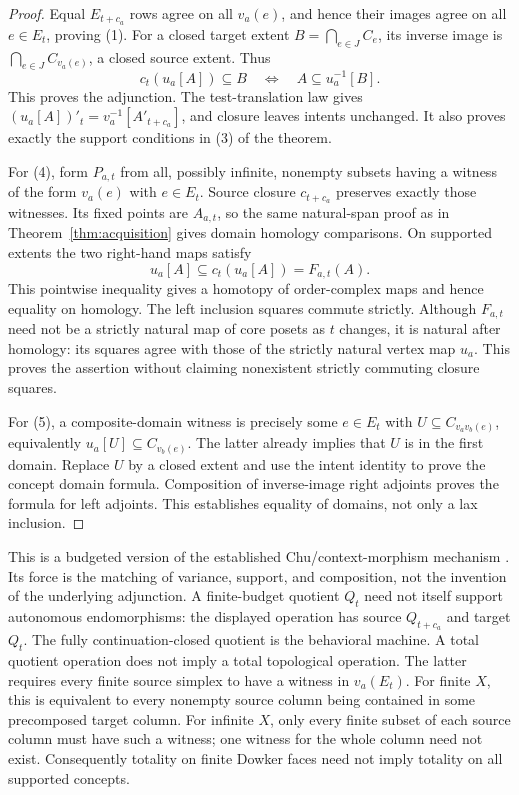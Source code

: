 \documentclass[11pt]{article}
\theoremstyle{definition}\newtheorem{definition}[theorem]{Definition}
\theoremstyle{remark}\newtheorem{remark}[theorem]{Remark}
\begin{document}
\begin{proof}
Equal $E_{t+c_a}$ rows agree on all $v_a(e)$, and hence their images agree
on all $e\in E_t$, proving (1). For a closed target extent
$B=\bigcap_{e\in J}C_e$, its inverse image is
$\bigcap_{e\in J}C_{v_a(e)}$, a closed source extent. Thus
\[
 c_t(u_a[A])\subseteq B\quad\Longleftrightarrow\quad
 A\subseteq u_a^{-1}[B].
\]
This proves the adjunction. The test-translation law gives
$(u_a[A])'_t=v_a^{-1}[A'_{t+c_a}]$, and closure leaves intents unchanged.
It also proves exactly the support conditions in (3) of the theorem.

For (4), form $P_{a,t}$ from all, possibly infinite, nonempty subsets
having a witness of the form $v_a(e)$ with $e\in E_t$.
Source closure $c_{t+c_a}$ preserves exactly those witnesses. Its fixed
points are $A_{a,t}$, so the same natural-span proof as in
Theorem~\ref{thm:acquisition} gives domain homology comparisons.
On supported extents the two right-hand maps satisfy
\[
 u_a[A]\subseteq c_t(u_a[A])=F_{a,t}(A).
\]
This pointwise inequality gives a homotopy of order-complex maps and hence
equality on homology. The left inclusion squares commute strictly.
Although $F_{a,t}$ need not be a strictly natural map of core posets as
$t$ changes, it is natural after homology: its squares agree with those
of the strictly natural vertex map $u_a$. This proves the assertion
without claiming nonexistent strictly commuting closure squares.

For (5), a composite-domain witness is precisely some $e\in E_t$ with
$U\subseteq C_{v_av_b(e)}$, equivalently $u_a[U]\subseteq C_{v_b(e)}$.
The latter already implies that $U$ is in the first domain. Replace $U$
by a closed extent and use the intent identity to prove the concept
domain formula. Composition of inverse-image right adjoints proves the
formula for left adjoints. This establishes equality of domains, not only
a lax inclusion.
\end{proof}
This is a budgeted version of the established Chu/context-morphism
mechanism \cite{shen,gratus}. Its force is the matching of variance,
support, and composition, not the invention of the underlying adjunction.
A finite-budget quotient $Q_t$ need not itself support autonomous
endomorphisms: the displayed operation has source $Q_{t+c_a}$ and target
$Q_t$. The fully continuation-closed quotient is the behavioral machine.
A total quotient operation does not imply a total topological operation.
The latter requires every finite source simplex to have a witness in
$v_a(E_t)$. For finite $X$, this is equivalent to every nonempty source
column being contained in some precomposed target column. For infinite $X$,
only every finite subset of each source column must have such a witness;
one witness for the whole column need not exist. Consequently totality on
finite Dowker faces need not imply totality on all supported concepts.
\end{document}
